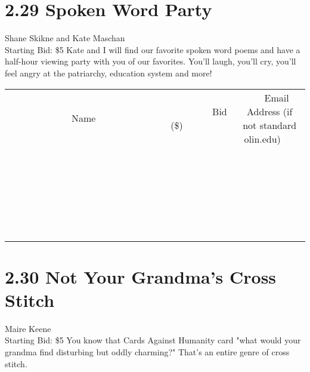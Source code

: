 \documentclass[11pt]{article}
\begin{document}
\section*{2.29 Spoken Word Party}
Shane Skikne and Kate Maschan
\\
Starting Bid: \$5
\newline
Kate and I will find our favorite spoken word poems and have a half-hour viewing party with you of our favorites. You'll laugh, you'll cry, you'll feel angry at the patriarchy, education system and more!
\\[6ex]
\begin{tabular}{c c c}
~~~~~~~~~~~~~Name~~~~~~~~~~~~~ & ~~~~~~~~~Bid (\$)~~~~~~~~~  & ~~~Email Address (if not standard olin.edu)~~~\\
 & & \\
\hline
 & & \\
\hline
 & & \\
\hline
 & & \\
\hline
 & & \\
\hline
 & & \\
\hline
 & & \\
\hline
 & & \\
\hline
 & & \\
\hline
 & & \\
\hline
 & & \\
\hline
 & & \\
\hline
 & & \\
\hline
 & & \\
\hline
 & & \\
\hline
 & & \\
\hline
 & & \\
\hline
 & & \\
\hline
 & & \\
\hline
 & & \\
\hline
 & & \\
\hline
 & & \\
\hline
 & & \\
\hline
 & & \\
\hline
 & & \\
\hline
 & & \\
\hline
\end{tabular}
\newpage
\section*{2.30 Not Your Grandma's Cross Stitch}
Maire Keene
\\
Starting Bid: \$5
\newline
You know that Cards Against Humanity card "what would your grandma find disturbing but oddly charming?" That's an entire genre of cross stitch.
\end{document}
